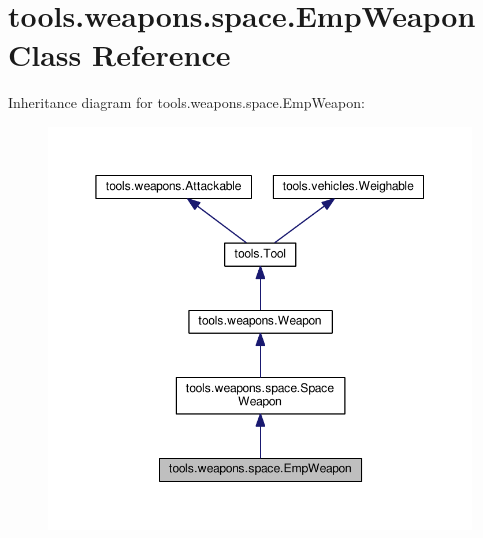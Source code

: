 \hypertarget{classtools_1_1weapons_1_1space_1_1_emp_weapon}{}\section{tools.\+weapons.\+space.\+Emp\+Weapon Class Reference}
\label{classtools_1_1weapons_1_1space_1_1_emp_weapon}


Inheritance diagram for tools.\+weapons.\+space.\+Emp\+Weapon\+:
\nopagebreak
\begin{figure}[H]
\begin{center}
\leavevmode
\includegraphics[width=350pt]{classtools_1_1weapons_1_1space_1_1_emp_weapon__inherit__graph}
\end{center}
\end{figure}


